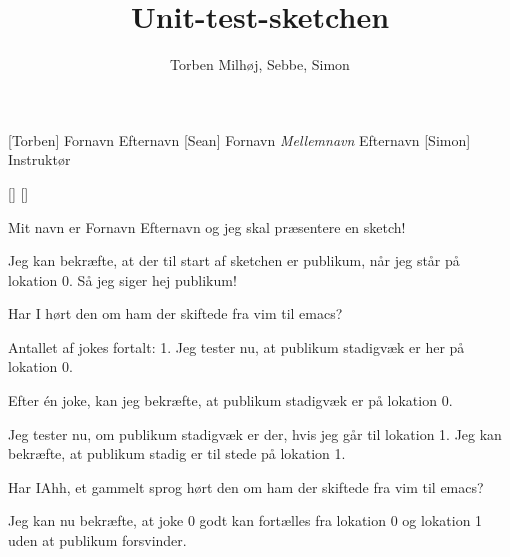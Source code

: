 \documentclass[a4paper,11pt]{article}
\title{Unit-test-sketchen}
\author{Torben Milhøj, Sebbe, Simon}
\begin{document}
\maketitle

\begin{roles}
[Torben] Fornavn Efternavn
[Sean] Fornavn \emph{Mellemnavn} Efternavn
[Simon] Instruktør
\end{roles}

\begin{props}
[]
[]
\end{props}


\begin{sketch}


 Mit navn er Fornavn Efternavn og jeg skal præsentere en sketch!

 Jeg kan bekræfte, at der til start af sketchen er publikum, når jeg står på lokation 0. Så jeg siger hej publikum!

 Har I hørt den om ham der skiftede fra vim til emacs?

 Antallet af jokes fortalt: 1. Jeg tester nu, at publikum stadigvæk er her på lokation 0.

 Efter én joke, kan jeg bekræfte, at publikum stadigvæk er på lokation 0.

 Jeg tester nu, om publikum stadigvæk er der, hvis jeg går til lokation 1.
 Jeg kan bekræfte, at publikum stadig er til stede på lokation 1.

 Har IAhh, et gammelt sprog hørt den om ham der skiftede fra vim til emacs?

 Jeg kan nu bekræfte, at joke 0 godt kan fortælles fra lokation 0 og lokation 1 uden at publikum forsvinder.



\end{sketch}
\end{document}
